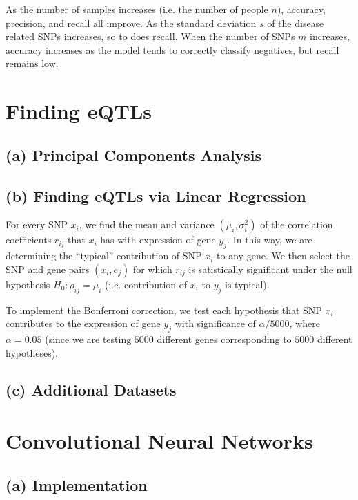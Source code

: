 \documentclass{article}[11pt]
\begin{document}
As the number of samples increases (i.e. the number of people $n$),
accuracy, precision, and recall all improve. As the standard
deviation $s$ of the disease related SNPs increases, so to does
recall. When the number of SNPs $m$ increases, accuracy increases
as the model tends to correctly classify negatives, but recall
remains low.

\section{Finding eQTLs}

\subsection*{(a) Principal Components Analysis}

\subsection*{(b) Finding eQTLs via Linear Regression}
For every SNP $x_i$, we find the mean and variance
$(\mu_{i}, \sigma_{i}^2)$ of the correlation coefficients $r_{ij}$ that 
$x_i$ has with expression of gene $y_j$. In this way, we are determining
the ``typical'' contribution of SNP $x_i$ to any gene.
We then select the SNP and gene pairs $(x_i, e_j)$ for which
$r_{ij}$ is satistically significant
under the null hypothesis $H_0: \rho_{ij} = \mu_{i}$ (i.e. contribution
of $x_i$ to $y_j$ is typical).

To implement the Bonferroni correction, we test
each hypothesis that SNP $x_i$ contributes
to the expression of gene $y_j$ with significance
of $\alpha / 5000$, where $\alpha = 0.05$ (since we are testing
$5000$ different genes corresponding to $5000$ different hypotheses).

\subsection*{(c) Additional Datasets}

\section{Convolutional Neural Networks}
\subsection*{(a) Implementation}
\end{document}
